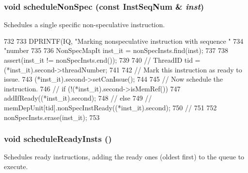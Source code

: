 \hypertarget{classInstQueue_a15ca5aaeab5bd4c2169ed41bbc7fb79c}{
\subsubsection[{scheduleNonSpec}]{\setlength{\rightskip}{0pt plus 5cm}void scheduleNonSpec (const {\bf InstSeqNum} \& {\em inst})}}
\label{classInstQueue_a15ca5aaeab5bd4c2169ed41bbc7fb79c}
Schedules a single specific non-\/speculative instruction. 


\begin{DoxyCode}
732 {
733     DPRINTF(IQ, "Marking nonspeculative instruction with sequence "
734             "number %
735 
736     NonSpecMapIt inst_it = nonSpecInsts.find(inst);
737 
738     assert(inst_it != nonSpecInsts.end());
739 
740 //    ThreadID tid = (*inst_it).second->threadNumber;
741 
742     // Mark this instruction as ready to issue.
743     (*inst_it).second->setCanIssue();
744 
745     // Now schedule the instruction.
746 //    if (!(*inst_it).second->isMemRef()) {
747         addIfReady((*inst_it).second);
748 //    } else {
749 //        memDepUnit[tid].nonSpecInstReady((*inst_it).second);
750 //    }
751 
752     nonSpecInsts.erase(inst_it);
753 }
\end{DoxyCode}
\hypertarget{classInstQueue_a3694e72427d3a616808797f9343d1fc4}{
\subsubsection[{scheduleReadyInsts}]{\setlength{\rightskip}{0pt plus 5cm}void scheduleReadyInsts ()}}
\label{classInstQueue_a3694e72427d3a616808797f9343d1fc4}
Schedules ready instructions, adding the ready ones (oldest first) to the queue to execute. 


